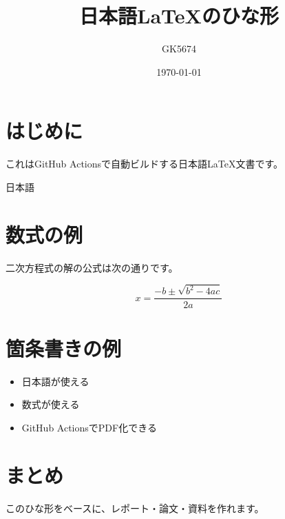 \documentclass{ltjsarticle}
\title{日本語LaTeXのひな形}
\author{GK5674}
\date{\today}
\begin{document}
\maketitle

\section{はじめに}

これはGitHub Actionsで自動ビルドする日本語LaTeX文書です。

日本語

\section{数式の例}

二次方程式の解の公式は次の通りです。

\[
x = \frac{-b \pm \sqrt{b^2 - 4ac}}{2a}
\]

\section{箇条書きの例}

\begin{itemize}
  \item 日本語が使える
  \item 数式が使える
  \item GitHub ActionsでPDF化できる
\end{itemize}

\section{まとめ}

このひな形をベースに、レポート・論文・資料を作れます。
\end{document}
